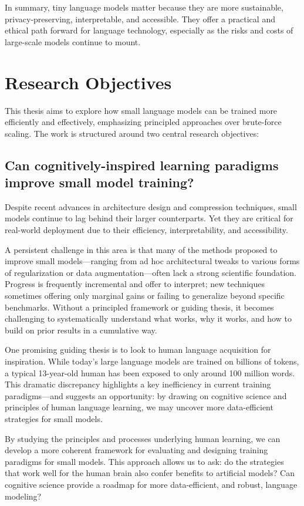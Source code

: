 In summary, tiny language models matter because they are more sustainable, privacy-preserving, interpretable, and accessible. They offer a practical and ethical path forward for language technology, especially as the risks and costs of large-scale models continue to mount.

\section*{Research Objectives}

This thesis aims to explore how small language models can be trained more efficiently and effectively, emphasizing principled approaches over brute-force scaling. The work is structured around two central research objectives:

\subsection{Can cognitively-inspired learning paradigms improve small model training?}

Despite recent advances in architecture design and compression techniques, small models continue to lag behind their larger counterparts. Yet they are critical for real-world deployment due to their efficiency, interpretability, and accessibility.

A persistent challenge in this area is that many of the methods proposed to improve small models—ranging from ad hoc architectural tweaks to various forms of regularization or data augmentation—often lack a strong scientific foundation. Progress is frequently incremental and offer to interpret; new techniques sometimes offering only marginal gains or failing to generalize beyond specific benchmarks. Without a principled framework or guiding thesis, it becomes challenging to systematically understand what works, why it works, and how to build on prior results in a cumulative way.

One promising guiding thesis is to look to human language acquisition for inspiration. While today's large language models are trained on billions of tokens, a typical 13-year-old human has been exposed to only around 100 million words. This dramatic discrepancy highlights a key inefficiency in current training paradigms—and suggests an opportunity: by drawing on cognitive science and principles of human language learning, we may uncover more data-efficient strategies for small models.

By studying the principles and processes underlying human learning, we can develop a more coherent framework for evaluating and designing training paradigms for small models. This approach allows us to ask: do the strategies that work well for the human brain also confer benefits to artificial models? Can cognitive science provide a roadmap for more data-efficient, and robust, language modeling?

